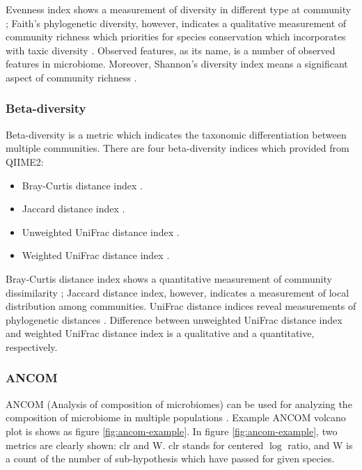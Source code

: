 \documentclass[a4paper]{article}
\begin{document}
                Evenness index shows a measurement of diversity in different type at community \cite{evenness1}; Faith's phylogenetic diversity, however, indicates a qualitative measurement of community richness which priorities for species conservation which incorporates with taxic diversity \cite{faith1}. Observed features, as its name, is a number of observed features in microbiome. Moreover, Shannon's diversity index means a significant aspect of community richness \cite{shannon1}.

            \subsubsection{Beta-diversity}
                Beta-diversity is a metric which indicates the taxonomic differentiation between multiple communities. There are four beta-diversity indices which provided from QIIME2:
                \begin{itemize}
                    \item Bray-Curtis distance index \cite{bray1}.
                    \item Jaccard distance index \cite{jaccard1}.
                    \item Unweighted UniFrac distance index \cite{unifrac1}.
                    \item Weighted UniFrac distance index \cite{unifrac1}.
                \end{itemize}

                Bray-Curtis distance index shows a quantitative measurement of community dissimilarity \cite{bray1}; Jaccard distance index, however, indicates a measurement of local distribution among communities. UniFrac distance indices reveal measurements of phylogenetic distances \cite{unifrac1}. Difference between unweighted UniFrac distance index and weighted UniFrac distance index is a qualitative and a quantitative, respectively.

            \subsubsection{ANCOM}
                ANCOM (Analysis of composition of microbiomes) can be used for analyzing the composition of microbiome in multiple populations \cite{ANCOM1}. Example ANCOM volcano plot is shows as figure \ref{fig:ancom-example}. In figure \ref{fig:ancom-example}, two metrics are clearly shown: clr and W. clr stands for centered $\log$ ratio, and W is a count of the number of sub-hypothesis which have passed for given species.
\end{document}
